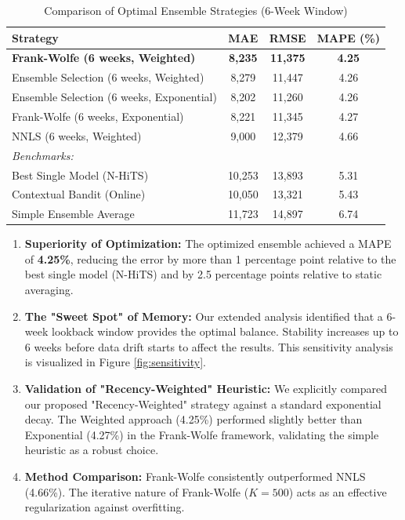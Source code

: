 \documentclass[journal,article,submit,pdftex,moreauthors]{Definitions/mdpi}
\begin{document}
\begin{table}[H]
\caption{Comparison of Optimal Ensemble Strategies (6-Week Window)}
\label{tab:ensemble_results}
\centering
\begin{tabular}{lccc}
\toprule
\textbf{Strategy} & \textbf{MAE} & \textbf{RMSE} & \textbf{MAPE (\%)} \\
\midrule
\textbf{Frank-Wolfe (6 weeks, Weighted)} & \textbf{8,235} & \textbf{11,375} & \textbf{4.25} \\
Ensemble Selection (6 weeks, Weighted) & 8,279 & 11,447 & 4.26 \\
Ensemble Selection (6 weeks, Exponential) & 8,202 & 11,260 & 4.26 \\
Frank-Wolfe (6 weeks, Exponential) & 8,221 & 11,345 & 4.27 \\
NNLS (6 weeks, Weighted) & 9,000 & 12,379 & 4.66 \\
\midrule
\textit{Benchmarks:} & & & \\
Best Single Model (N-HiTS) & 10,253 & 13,893 & 5.31 \\
Contextual Bandit (Online) & 10,050 & 13,321 & 5.43 \\
Simple Ensemble Average & 11,723 & 14,897 & 6.74 \\
\bottomrule
\end{tabular}
\end{table}

\begin{enumerate}
    \item \textbf{Superiority of Optimization:} The optimized ensemble achieved a MAPE of \textbf{4.25\%}, reducing the error by more than 1 percentage point relative to the best single model (N-HiTS) and by 2.5 percentage points relative to static averaging.
    \item \textbf{The "Sweet Spot" of Memory:} Our extended analysis identified that a 6-week lookback window provides the optimal balance. Stability increases up to 6 weeks before data drift starts to affect the results. This sensitivity analysis is visualized in Figure \ref{fig:sensitivity}.
    \item \textbf{Validation of "Recency-Weighted" Heuristic:} We explicitly compared our proposed "Recency-Weighted" strategy against a standard exponential decay. The Weighted approach (4.25\%) performed slightly better than Exponential (4.27\%) in the Frank-Wolfe framework, validating the simple heuristic as a robust choice.
    \item \textbf{Method Comparison:} Frank-Wolfe consistently outperformed NNLS (4.66\%). The iterative nature of Frank-Wolfe ($K=500$) acts as an effective regularization against overfitting.
\end{enumerate}
\end{document}
